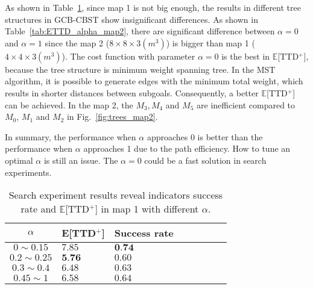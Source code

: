 As shown in Table~\ref{tab:ETTD_alpha_map1}, since map 1 is not big enough, the results in different tree structures in GCB-CBST show insignificant differences.
As shown in Table~\ref{tab:ETTD_alpha_map2}, there are significant difference between $\alpha=0$ and $\alpha=1$ since the map 2 ($8\times8\times3 (m^3)$) is bigger than map 1 ($4\times4\times3 (m^3)$).
The cost function with parameter $\alpha=0$ is the best in $\mathbb{E}$[TTD$^+$], because the tree structure is minimum weight spanning tree.
In the MST algorithm, it is possible to generate edges with the minimum total weight, which results in shorter distances between subgoals.
Consequently, a better $\mathbb{E}$[TTD$^+$] can be achieved.
In the map 2, the $M_3, M_4$ and $M_5$ are inefficient compared to $M_0$, $M_1$ and $M_2$ in Fig.~\ref{fig:trees_map2}.

In summary, the performance when $\alpha$ approaches 0 is better than the performance when $\alpha$ approaches 1
due to the path efficiency.
How to tune an optimal $\alpha$ is still an issue.
The $\alpha=0$ could be a fast solution in search experiments.




\begin{table}[htbp]
   \caption{Search experiment results reveal indicators success rate and $\mathbb{E}$[TTD$^+$] in map 1 with different $\alpha$.}
   \begin{center}
     \begin{tabular}{| c | l | l | l | l | l |  l | l |} \hline
     $\alpha$ & E[TTD$^+$] & Success rate\\ \hline
     $0\sim 0.15$  & $7.85$  & $\textbf{0.74}$\\ \hline
     $0.2\sim 0.25$ & $\textbf{5.76}$  & $0.60$ \\ \hline
     $0.3\sim 0.4$ & $6.48$  & $0.63$\\ \hline
     $0.45\sim 1$ & $6.58$ & $0.64$ \\ \hline
    \end{tabular}
   \end{center}
   \label{tab:ETTD_alpha_map1}
\end{table}

